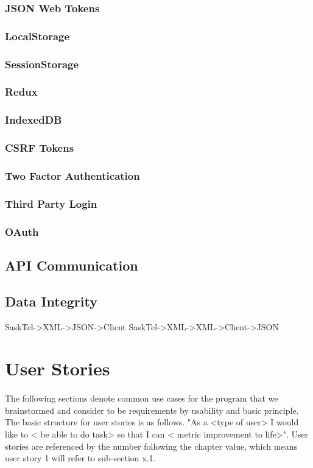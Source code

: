 \documentclass[12pt]{article}
\begin{document}
	\subsubsection{JSON Web Tokens}
	\subsubsection{LocalStorage}
	\subsubsection{SessionStorage}
	\subsubsection{Redux}
	\subsubsection{IndexedDB}
	\subsubsection{CSRF Tokens}
	\subsubsection{Two Factor Authentication}
	\subsubsection{Third Party Login}
	\subsubsection{OAuth}

\subsection{API Communication}

\subsection{Data Integrity}
	SaskTel->XML->JSON->Client
	SaskTel->XML->XML->Client->JSON


\newpage

\section{User Stories}
\paragraph{}	The following sections denote common use cases for the program that we brainstormed and consider to be requirements by usability and basic principle. The basic structure for user stories is as follows. "As a <type of user> I would like to < be able to do task> so that I can < metric improvement to life>". User stories are referenced by the number following the chapter value, which means user story 1 will refer to sub-section x.1.
\end{document}
